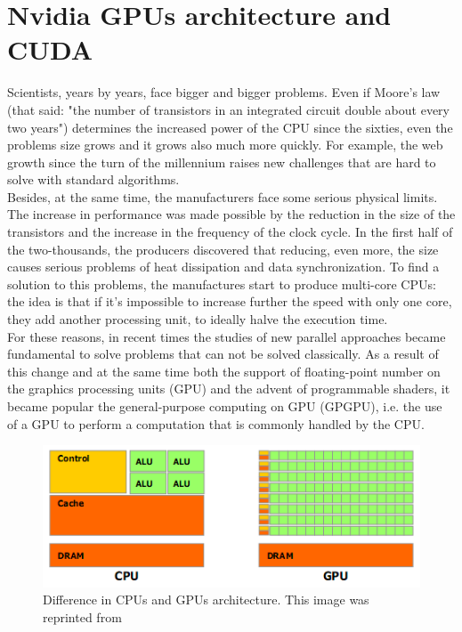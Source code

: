 \section{Nvidia GPUs architecture and CUDA}\label{C2}
Scientists, years by years, face bigger and bigger problems. 
Even if Moore's law (that said: "the number of transistors in an integrated circuit double about every two years") determines the increased power of the CPU since the sixties, even the problems size grows and it grows also much more quickly. For example, the web growth since the turn of the millennium raises new challenges that are hard to solve with standard algorithms.  \\
Besides, at the same time, the manufacturers face some serious physical limits. The increase in performance was made possible by the reduction in the size of the transistors and the increase in the frequency of the clock cycle. In the first half of the two-thousands, the producers discovered that reducing, even more, the size causes serious problems of heat dissipation and data synchronization. To find a solution to this problems, the manufactures start to produce multi-core CPUs: the idea is that if it's impossible to increase further the speed with only one core, they add another processing unit, to ideally halve the execution time.\\
For these reasons, in recent times the studies of new parallel approaches became fundamental to solve problems that can not be solved classically. As a result of this change and at the same time both the support of floating-point number on the graphics processing units (GPU) and the advent of programmable shaders, it became popular the general-purpose computing on GPU (GPGPU), i.e. the use of a GPU to perform a computation that is commonly handled by the CPU.\\
\begin{figure}[h]
	\centering
	\includegraphics[width=0.7\linewidth]{0-resources/cpugpuhardware}
	\caption{Difference in CPUs and GPUs architecture. This image was reprinted from \cite{cuda_manual} }
	\label{fig:cpugpuhardware}
\end{figure}
\\
